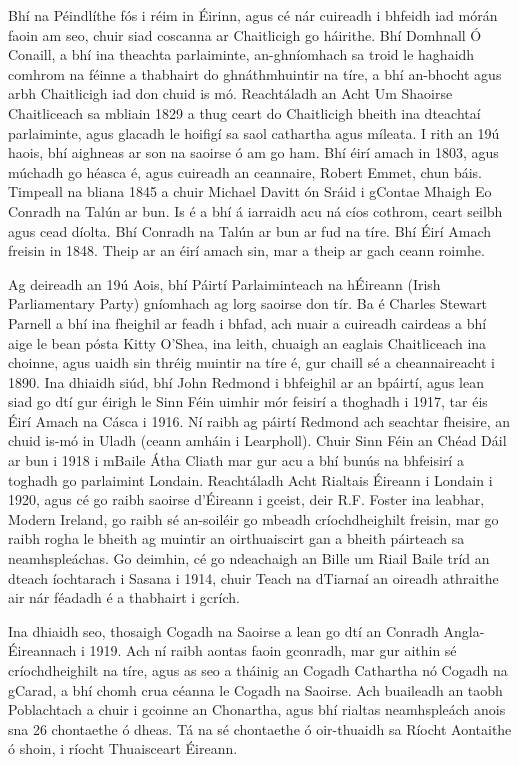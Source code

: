 \documentclass[a4paper,12pt]{article}
\theoremstyle{plain} %
\theoremstyle{definition} %
\theoremstyle{remark} %
\begin{document}
Bhí na Péindlíthe fós i réim in Éirinn, agus cé nár cuireadh i bhfeidh iad mórán faoin am seo, chuir siad coscanna ar Chaitlicigh go háirithe. Bhí Domhnall Ó Conaill, a bhí ina theachta parlaiminte, an-ghníomhach sa troid le haghaidh comhrom na féinne a thabhairt do ghnáthmhuintir na tíre, a bhí an-bhocht agus arbh Chaitlicigh iad don chuid is mó. Reachtáladh an Acht Um Shaoirse Chaitliceach sa mbliain 1829 a thug ceart do Chaitlicigh bheith ina dteachtaí parlaiminte, agus glacadh le hoifigí sa saol cathartha agus míleata.
I rith an 19ú haois, bhí aighneas ar son na saoirse ó am go ham. Bhí éirí amach in 1803, agus múchadh go héasca é, agus cuireadh an ceannaire, Robert Emmet, chun báis. Timpeall na bliana 1845 a chuir Michael Davitt ón Sráid i gContae Mhaigh Eo Conradh na Talún ar bun. Is é a bhí á iarraidh acu ná cíos cothrom, ceart seilbh agus cead díolta. Bhí Conradh na Talún ar bun ar fud na tíre. Bhí Éirí Amach freisin in 1848. Theip ar an éirí amach sin, mar a theip ar gach ceann roimhe.

Ag deireadh an 19ú Aois, bhí Páirtí Parlaiminteach na hÉireann (Irish Parliamentary Party) gníomhach ag lorg saoirse don tír. Ba é Charles Stewart Parnell a bhí ina fheighil ar feadh i bhfad, ach nuair a cuireadh cairdeas a bhí aige le bean pósta Kitty O'Shea, ina leith, chuaigh an eaglais Chaitliceach ina choinne, agus uaidh sin thréig muintir na tíre é, gur chaill sé a cheannaireacht i 1890. Ina dhiaidh siúd, bhí John Redmond i bhfeighil ar an bpáirtí, agus lean siad go dtí gur éirigh le Sinn Féin uimhir mór feisirí a thoghadh i 1917, tar éis Éirí Amach na Cásca i 1916. Ní raibh ag páirtí Redmond ach seachtar fheisire, an chuid is-mó in Uladh (ceann amháin i Learpholl).
Chuir Sinn Féin an Chéad Dáil ar bun i 1918 i mBaile Átha Cliath mar gur acu a bhí bunús na bhfeisirí a toghadh go parlaimint Londain. Reachtáladh Acht Rialtais Éireann i Londain i 1920, agus cé go raibh saoirse d'Éireann i gceist, deir R.F. Foster ina leabhar, Modern Ireland, go raibh sé an-soiléir go mbeadh críochdheighilt freisin, mar go raibh rogha le bheith ag muintir an oirthuaiscirt gan a bheith páirteach sa neamhspleáchas. Go deimhin, cé go ndeachaigh an Bille um Riail Baile tríd an dteach íochtarach i Sasana i 1914, chuir Teach na dTiarnaí an oireadh athraithe air nár féadadh é a thabhairt i gcrích.

Ina dhiaidh seo, thosaigh Cogadh na Saoirse a lean go dtí an Conradh Angla-Éireannach i 1919. Ach ní raibh aontas faoin gconradh, mar gur aithin sé críochdheighilt na tíre, agus as seo a tháinig an Cogadh Cathartha nó Cogadh na gCarad, a bhí chomh crua céanna le Cogadh na Saoirse. Ach buaileadh an taobh Poblachtach a chuir i gcoinne an Chonartha, agus bhí rialtas neamhspleách anois sna 26 chontaethe ó dheas. Tá na sé chontaethe ó oir-thuaidh sa Ríocht Aontaithe ó shoin, i ríocht Thuaisceart Éireann.
\end{document}
